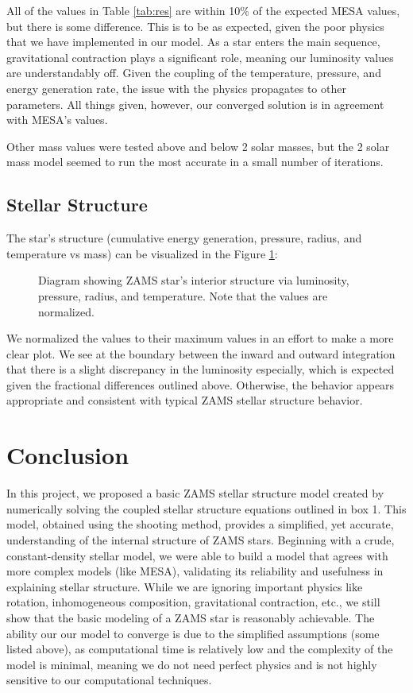 \documentclass[twocolumn]{aastex631}
\begin{document}
All of the values in Table \ref{tab:res} are within 10\% of the expected MESA values, but there is some difference. This is to be as expected, given the poor physics that we have implemented in our model. As a star enters the main sequence, gravitational contraction plays a significant role, meaning our luminosity values are understandably off. Given the coupling of the temperature, pressure, and energy generation rate, the issue with the physics propagates to other parameters. All things given, however, our converged solution is in agreement with MESA's values.

Other mass values were tested above and below 2 solar masses, but the 2 solar mass model seemed to run the most accurate in a small number of iterations.

\subsection{Stellar Structure}

The star's structure (cumulative energy generation, pressure, radius, and temperature vs mass) can be visualized in the Figure \ref{fig:tot}: 

\begin{figure}[ht!]
	\label{fig:tot}
	\caption{Diagram showing ZAMS star's interior structure via luminosity, pressure, radius, and temperature. Note that the values are normalized.}
\end{figure}

We normalized the values to their maximum values in an effort to make a more clear plot. We see at the boundary between the inward and outward integration that there is a slight discrepancy in the luminosity especially, which is expected given the fractional differences outlined above. Otherwise, the behavior appears appropriate and consistent with typical ZAMS stellar structure behavior.


\section{Conclusion}

In this project, we proposed a basic ZAMS stellar structure model created by numerically solving the coupled stellar structure equations outlined in box 1. This model, obtained using the shooting method, provides a simplified, yet accurate, understanding of the internal structure of ZAMS stars. Beginning with a crude, constant-density stellar model, we were able to build a model that agrees with more complex models (like MESA), validating its reliability and usefulness in explaining stellar structure. While we are ignoring important physics like rotation, inhomogeneous composition, gravitational contraction, etc., we still show that the basic modeling of a ZAMS star is reasonably achievable. The ability our our model to converge is due to the simplified assumptions (some listed above), as computational time is relatively low and the complexity of the model is minimal, meaning we do not need perfect physics and is not highly sensitive to our computational techniques.
\end{document}
